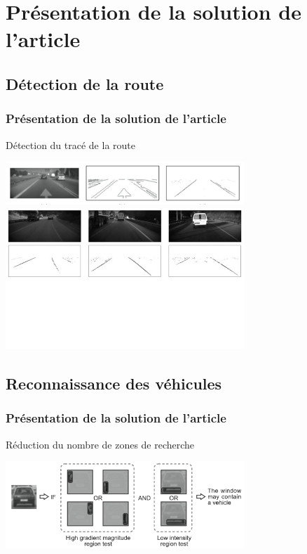 \section{Présentation de la solution de l'article}


\subsection{Détection de la route}
\begin{frame}
\frametitle{Présentation de la solution de l'article}

Détection du tracé de la route
\begin{center}
  \includegraphics[width=9cm]{image/marquage.png}\\
  \includegraphics[width=9cm]{image/lignes.png}
\end{center}

\end{frame}

\subsection{Reconnaissance des véhicules}
\begin{frame}
\frametitle{Présentation de la solution de l'article}

Réduction du nombre de zones de recherche
\begin{center}
  \includegraphics[width=9cm]{image/fenetreVehicule.png}
\end{center}

\end{frame}

